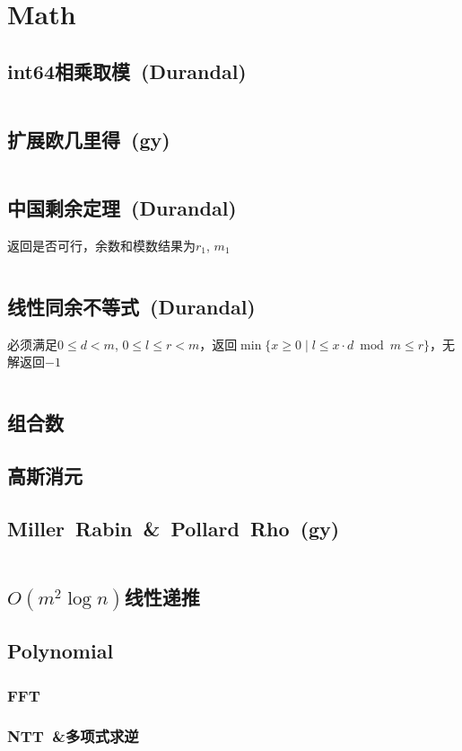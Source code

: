 \chapter{Math}
\section{int64相乘取模\ \small(Durandal)}
	\inputminted{cpp}{Math/int64_multiply_mod.cpp}
\section{扩展欧几里得\ \small(gy)}
	\inputminted{cpp}{Math/extend_gcd.cpp}
\section{中国剩余定理\ \small(Durandal)}
	返回是否可行，余数和模数结果为$ r_1 $, $ m_1 $
	\inputminted{cpp}{Math/chinese_remainder_theorem.cpp}
\section{线性同余不等式\ \small(Durandal)}
	必须满足$ 0 \leq d < m $, $ 0 \leq l \leq r < m $，返回$ \min\lbrace x \geq 0 \mid l \leq x \cdot d \bmod m \leq r \rbrace $，无解返回$ -1 $ 
	\inputminted{cpp}{Math/linear_congruence_inequality.cpp}
\section{组合数}
\section{高斯消元}
\section{Miller\ Rabin\ \&\ Pollard\ Rho\ \small(gy)}
	\inputminted{cpp}{Math/miller_rabin_and_pollard_rho.cpp}
\section{$ O(m ^ 2 \log n) $线性递推}
\section{Polynomial}
	\subsection{FFT}
	\subsection{NTT\ \&多项式求逆}
